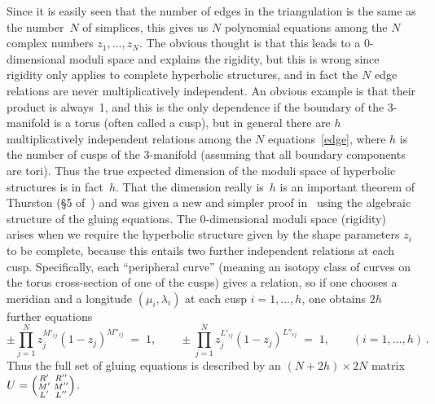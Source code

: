 \documentclass[12pt,reqno]{amsart}
\theoremstyle{definition}
\def\={\;=\;}
\def\be{\begin{equation}}
\def\ee{\end{equation}}
\def\R{\mathbb R}
\def\L{\Lambda}
\begin{document}
Since it is easily seen that the number of edges in the triangulation is the same as 
the number~$N$ of simplices, this gives us $N$ polynomial equations among the $N$ complex
numbers $z_1,\dots,z_N$.  The obvious thought is that this leads to a 0-dimensional 
moduli space and explains the rigidity, but this is wrong since rigidity only applies 
to complete hyperbolic structures, and in fact the $N$ edge relations are never
multiplicatively
independent. An obvious example is that their product is always~1, and this is the
only dependence if the boundary of the 3-manifold is a torus (often called a cusp),
but in general there are $h$ multiplicatively independent relations among the $N$
equations~\eqref{edge}, where $h$ is the number of cusps of the 3-manifold (assuming that
all boundary components are tori). Thus the true expected 
dimension of the moduli space of hyperbolic structures is in fact~$h$.  That the 
dimension really is~$h$ is an important theorem of Thurston (\S5 of~\cite{Thurston}) and 
was given a new and simpler proof in~\cite{NZ} using the algebraic structure of the 
gluing equations.
The 0-dimensional moduli space (rigidity) arises when we require the hyperbolic structure
given by the shape parameters $z_i$ to be complete, because this entails two further
independent relations at each cusp.  Specifically, each ``peripheral curve'' (meaning an 
isotopy class of curves on the torus cross-section of one of the cusps) gives a relation,  
so if one chooses a meridian and a longitude $(\mu_i,\lambda_i)$ at each cusp 
$i=1,\dots,h$, one obtains $2h$ further equations
\be \label{ML}
\pm\prod_{j=1}^N z_j^{M'_{ij}} (1-z_j)^{M''_{ij}} \= 1, \qquad
\pm\prod_{j=1}^N z_j^{L'_{ij}} (1-z_j)^{L''_{ij}} \= 1, \qquad (i=1,\dots,h) \,.  
\ee
Thus the full set of gluing equations is described by an $(N+2h) \times 2N$ matrix 
$U=\Bigl(\!\begin{smallmatrix} R'&R''\\M'&M''\\L'&L''\end{smallmatrix}\!\Bigr)$. 
\end{document}
